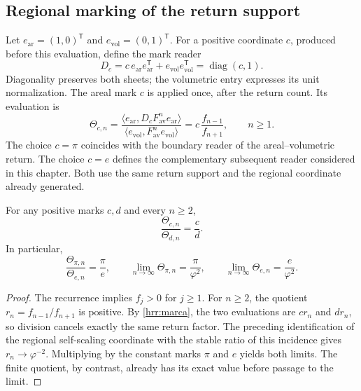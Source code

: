 \subsection{Regional marking of the return support}

Let \(e_{\mathrm{ar}}=(1,0)^{\mathsf T}\) and \(e_{\mathrm{vol}}=(0,1)^{\mathsf T}\). For a positive coordinate \(c\), produced before this evaluation, define the mark reader
\[
 D_c=c\,e_{\mathrm{ar}}e_{\mathrm{ar}}^{\mathsf T}
       +e_{\mathrm{vol}}e_{\mathrm{vol}}^{\mathsf T}
     =\operatorname{diag}(c,1).
\]
Diagonality preserves both sheets; the volumetric entry expresses its unit normalization. The areal mark \(c\) is applied once, after the return count. Its evaluation is
\begin{equation}
 \Theta_{c,n}=
 \frac{\langle e_{\mathrm{ar}},D_c F_{\mathrm{av}}^n
 e_{\mathrm{ar}}\rangle}
 {\langle e_{\mathrm{vol}},F_{\mathrm{av}}^n
 e_{\mathrm{vol}}\rangle}
 =c\,\frac{f_{n-1}}{f_{n+1}},\qquad n\geq1.
 \label{hrr:marca}
\end{equation}
The choice \(c=\pi\) coincides with the boundary reader of the areal--volumetric return. The choice \(c=e\) defines the complementary subsequent reader considered in this chapter. Both use the same return support and the regional coordinate already generated.

\begin{theorem}
\label{hrr:cociente} For any positive marks \(c,d\) and every \(n\geq2\),
\begin{equation}
 \frac{\Theta_{c,n}}{\Theta_{d,n}}=\frac cd.
 \label{hrr:cociente-exacto}
\end{equation}
In particular,
\begin{equation}
 \frac{\Theta_{\pi,n}}{\Theta_{e,n}}=\frac\pi e,
 \qquad
 \lim_{n\to\infty}\Theta_{\pi,n}=\frac\pi{\varphi^2},
 \qquad
 \lim_{n\to\infty}\Theta_{e,n}=\frac e{\varphi^2}.
 \label{hrr:pi-e-phi}
\end{equation}
\end{theorem}
\begin{proof}
The recurrence implies \(f_j>0\) for \(j\geq1\). For \(n\geq2\), the quotient \(r_n=f_{n-1}/f_{n+1}\) is positive. By \eqref{hrr:marca}, the two evaluations are \(cr_n\) and \(dr_n\), so division cancels exactly the same return factor. The preceding identification of the regional self-scaling coordinate with the stable ratio of this incidence gives \(r_n\to\varphi^{-2}\). Multiplying by the constant marks \(\pi\) and \(e\) yields both limits. The finite quotient, by contrast, already has its exact value before passage to the limit.
\end{proof}

